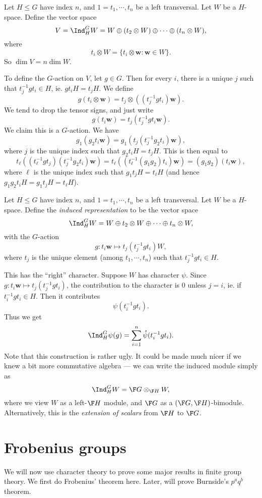 \documentclass[a4paper]{article}
\begin{document}
Let $H \leq G$ have index $n$, and $1 = t_1, \cdots, t_n$ be a left transversal. Let $W$ be a $H$-space. Define the vector space
\[
  V = \Ind_H^G W = W \oplus (t_2 \otimes W) \oplus \cdots \oplus (t_n \otimes W),
\]
where
\[
  t_i \otimes W = \{t_i \otimes \mathbf{w}: \mathbf{w} \in W\}.
\]
So $\dim V = n \dim W$.

To define the $G$-action on $V$, let $g \in G$. Then for every $i$, there is a unique $j$ such that $t_j^{-1} g t_i \in H$, ie. $gt_iH = t_j H$. We define
\[
  g(t_i \otimes \mathbf{w}) = t_j \otimes ((t_j^{-1}gt_i) \mathbf{w}).
\]
We tend to drop the tensor signs, and just write
\[
  g(t_i \mathbf{w}) = t_j (t_j^{-1} g t_i \mathbf{w}).
\]
We claim this is a $G$-action. We have
\[
  g_1(g_2 t_i \mathbf{w}) = g_1(t_j(t_j^{-1} g_2 t_i)\mathbf{w}),
\]
where $j$ is the unique index such that $g_2 t_i H = t_j H$. This is then equal to
\[
  t_\ell ((t_\ell^{-1} g t_j)(t_j^{-1} g_2 t_i) \mathbf{w}) = t_\ell((t_\ell^{-1}(g_1g_2)t_i) \mathbf{w}) = (g_1g_2)(t_i \mathbf{w}),
\]
where $\ell$ is the unique index such that $g_1 t_j H = t_\ell H$ (and hence $g_1 g_2 t_i H = g_1 t_j H = t_\ell H$).

\begin{defi}
  Let $H \leq G$ have index $n$, and $1 = t_1, \cdots, t_n$ be a left transversal. Let $W$ be a $H$-space. Define the \emph{induced representation} to be the vector space
  \[
    \Ind_H^G W = W \oplus t_2 \otimes W \oplus \cdots \oplus t_n \otimes W,
  \]
  with the $G$-action
  \[
    g: t_i \mathbf{w} \mapsto t_j (t_j^{-1} g t_i)W,
  \]
  where $t_j$ is the unique element (among $t_1, \cdots, t_n$) such that $t_j^{-1} gt_i \in H$.
\end{defi}

This has the ``right'' character. Suppose $W$ has character $\psi$. Since $g: t_i \mathbf{w} \mapsto t_j (t_j^{-1} gt_i)$, the contribution to the character is $0$ unless $j = i$, ie. if $t_i^{-1} g t_i \in H$. Then it contributes
\[
  \psi (t_i^{-1} g t_i).
\]
Thus we get
\[
  \Ind_H^G \psi(g) = \sum_{i = 1}^n \mathring{\psi}(t_i^{-1} g t_i).
\]
Note that this construction is rather ugly. It could be made much nicer if we knew a bit more commutative algebra --- we can write the induced module simply as
\[
  \Ind_H^G W = \F G \otimes_{\F H} W,
\]
where we view $W$ as a left-$\F H$ module, and $\F G$ as a $(\F G, \F H)$-bimodule. Alternatively, this is the \emph{extension of scalars} from $\F H$ to $\F G$.

\section{Frobenius groups}
We will now use character theory to prove some major results in finite group theory. We first do Frobenius' theorem here. Later, will prove Burnside's $p^a q^b$ theorem.
\end{document}
